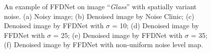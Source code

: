 \documentclass[journal]{IEEEtran}
\begin{document}
\begin{figure}[!htbp]
\begin{center}
\caption{An example of FFDNet on image ``\emph{Glass}'' with spatially variant noise. (a) Noisy image; (b) Denoised image by Noise Clinic; (c) Denoised image by FFDNet with $\sigma$ = 10; (d) Denoised image by FFDNet with $\sigma$ = 25; (e) Denoised image by FFDNet with $\sigma$ = 35; (f) Denoised image by FFDNet with non-uniform noise level map.}\label{fig_rn4}
\end{center}
\end{figure}
\end{document}
